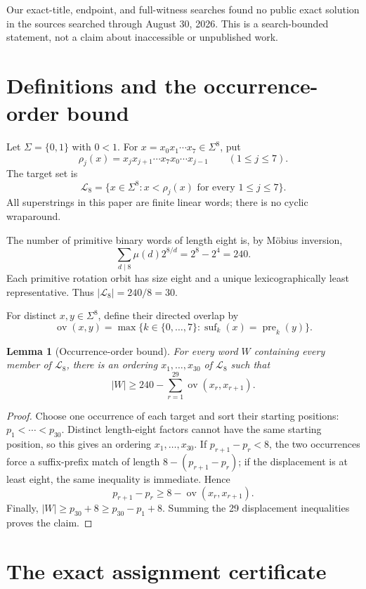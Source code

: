 \documentclass[11pt]{amsart}
\newtheorem{lemma}[theorem]{Lemma}
\theoremstyle{definition}
\newcommand{\Lyn}{\mathcal{L}}
\newcommand{\ov}{\operatorname{ov}}
\newcommand{\pre}{\operatorname{pre}}
\newcommand{\suf}{\operatorname{suf}}
\begin{document}
Our exact-title, endpoint, and full-witness searches found no public exact
solution in the sources searched through August 30, 2026.  This is a
search-bounded statement, not a claim about inaccessible or unpublished work.

\section{Definitions and the occurrence-order bound}

Let $\Sigma=\{0,1\}$ with $0<1$.  For
$x=x_0x_1\cdots x_7\in\Sigma^8$, put
\[
 \rho_j(x)=x_jx_{j+1}\cdots x_7x_0\cdots x_{j-1}
 \qquad(1\le j\le7).
\]
The target set is
\[
 \Lyn_8=\{x\in\Sigma^8:x<\rho_j(x)\text{ for every }1\le j\le7\}.
\]
All superstrings in this paper are finite linear words; there is no cyclic
wraparound.

The number of primitive binary words of length eight is, by M\"obius
inversion,
\[
 \sum_{d\mid8}\mu(d)2^{8/d}=2^8-2^4=240.
\]
Each primitive rotation orbit has size eight and a unique lexicographically
least representative.  Thus $|\Lyn_8|=240/8=30$.

For distinct $x,y\in\Sigma^8$, define their directed overlap by
\[
 \ov(x,y)=\max\{k\in\{0,\ldots,7\}:\suf_k(x)=\pre_k(y)\}.
\]

\begin{lemma}[Occurrence-order bound]\label{lem:occurrence}
For every word $W$ containing every member of $\Lyn_8$, there is an ordering
$x_1,\ldots,x_{30}$ of $\Lyn_8$ such that
\[
 |W|\ge 240-\sum_{r=1}^{29}\ov(x_r,x_{r+1}).
\]
\end{lemma}

\begin{proof}
Choose one occurrence of each target and sort their starting positions:
$p_1<\cdots<p_{30}$.  Distinct length-eight factors cannot have the same
starting position, so this gives an ordering $x_1,\ldots,x_{30}$.
If $p_{r+1}-p_r<8$, the two occurrences force a suffix-prefix match of length
$8-(p_{r+1}-p_r)$; if the displacement is at least eight, the same inequality
is immediate.  Hence
\[
 p_{r+1}-p_r\ge8-\ov(x_r,x_{r+1}).
\]
Finally, $|W|\ge p_{30}+8\ge p_{30}-p_1+8$.  Summing the 29 displacement
inequalities proves the claim.
\end{proof}

\section{The exact assignment certificate}
\end{document}
